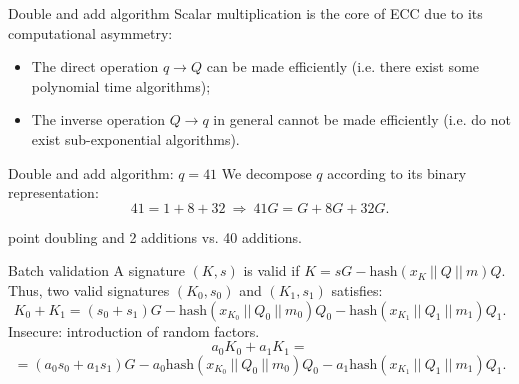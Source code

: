 \documentclass[slidescentered]{beamer}
\begin{document}
	\begin{frame}{Double and add algorithm}
		Scalar multiplication is the core of ECC due to its computational asymmetry:
		\begin{itemize}
			\item The direct operation $q \to Q$ can be made efficiently (i.e. there exist some polynomial time algorithms);
			\item The inverse operation $Q \to q$ in general cannot be made efficiently (i.e. do not exist sub-exponential algorithms).
		\end{itemize}
	
		\bigskip
		\noindent
			
		\begin{block}{Double and add algorithm: $q = 41$}
			We decompose $q$ according to its binary representation:
			$$41 = 1 + 8 + 32  \ \Longrightarrow \ 41G = G + 8G + 32G.$$
			
			 point doubling and 2 additions vs. 40 additions.
	\end{block}
	\end{frame}

	\begin{frame}{Batch validation}
		A signature $(K, s)$ is valid if $K = sG - \text{hash}(x_K \ || \ Q \ || \ m)Q$. Thus, two valid signatures $(K_0, s_0)$ and $(K_1, s_1)$ satisfies:
		$$K_0 + K_1 = (s_0 + s_1)G - \text{hash}(x_{K_0} \ || \ Q_0 \ || \ m_0)Q_0 - \text{hash}(x_{K_1} \ || \ Q_1 \ || \ m_1)Q_1.$$
		Insecure: introduction of random factors.
		$$a_0K_0 + a_1K_1 =$$ $$
		= (a_0s_0 + a_1s_1)G - a_0\text{hash}(x_{K_0} \ || \ Q_0 \ || \ m_0)Q_0 - a_1\text{hash}(x_{K_1} \ || \ Q_1 \ || \ m_1)Q_1.$$
	\end{frame}
\end{document}
